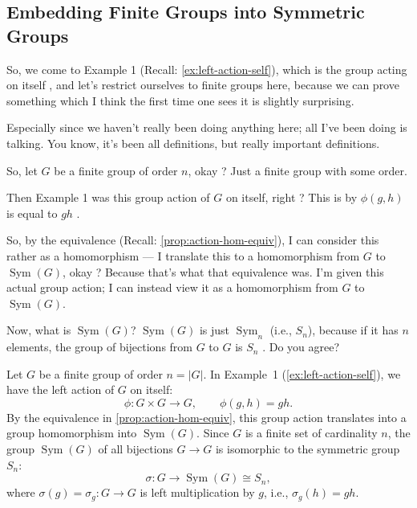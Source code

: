 \subsection{Embedding Finite Groups into Symmetric Groups}

\begin{speech}[01:11:57 - 01:13:42]
So, we come to Example 1 (Recall: \cref{ex:left-action-self}), which is the group acting on itself , and let's restrict ourselves to finite groups here, because we can prove something which I think the first time one sees it is slightly surprising.

Especially since we haven't really been doing anything here; all I've been doing is talking. You know, it's been all definitions, but really important definitions.

So, let $G$ be a finite group of order $n$, okay ? Just a finite group with some order.

Then Example 1 was this group action of $G$ on itself, right ? This is by $\phi(g, h)$ is equal to $gh$ .

So, by the equivalence (Recall: \cref{prop:action-hom-equiv}), I can consider this rather as a homomorphism --- I translate this  to a homomorphism from $G$ to $\operatorname{Sym}(G)$, okay ? Because that's what that equivalence was. I'm given this actual group action; I can instead view it as a homomorphism from $G$ to $\operatorname{Sym}(G)$.

Now, what is $\operatorname{Sym}(G)$? $\operatorname{Sym}(G)$ is just $\operatorname{Sym}_n$ (i.e., $S_n$), because if it has $n$ elements, the group of bijections from $G$ to $G$ is $S_n$ . Do you agree?
\end{speech}

\begin{content}
Let $G$ be a finite group of order $n = |G|$. In Example~1 (\cref{ex:left-action-self}), we have the left action of $G$ on itself:
\[
\phi \colon G \times G \longrightarrow G, \qquad \phi(g, h) = gh.
\]
By the equivalence in \cref{prop:action-hom-equiv}, this group action translates into a group homomorphism into $\operatorname{Sym}(G)$. Since $G$ is a finite set of cardinality $n$, the group $\operatorname{Sym}(G)$ of all bijections $G \to G$ is isomorphic to the symmetric group $S_n$:
\[
\sigma \colon G \longrightarrow \operatorname{Sym}(G) \cong S_n,
\]
where $\sigma(g) = \sigma_g \colon G \to G$ is left multiplication by $g$, i.e., $\sigma_g(h) = gh$.
\end{content}


